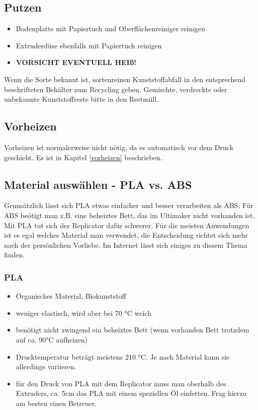 \documentclass{\basedir/fablab-document}
\begin{document}
\subsection{Putzen} \label{putzen}
\begin{itemize}
 \item Bodenplatte mit Papiertuch und Oberflächenreiniger reinigen
 \item Extruderdüse ebenfalls mit Papiertuch reinigen
 \item \textbf{VORSICHT EVENTUELL HEIß!}
\end{itemize}

Wenn die Sorte bekannt ist, sortenreinen Kunststoffabfall in den entsprechend beschrifteten Behälter zum Recycling geben. Gemischte, verdreckte oder unbekannte Kunststoffreste bitte in den Restmüll.

\subsection{Vorheizen}
Vorheizen ist normalerweise nicht nötig, da es automatisch vor dem Druck geschieht. Es ist in Kapitel \ref{vorheizen} beschrieben.

\subsection{Material auswählen - PLA vs. ABS}
Grunsätzlich lässt sich PLA etwas einfacher und besser verarbeiten als ABS. Für ABS beötigt man z.B. eine beheiztes
Bett, das im Ultimaker nicht vorhanden ist. Mit PLA tut sich der Replicator dafür schwerer. Für die meisten 
Anwendungen ist es egal welches Material man verwendet, die Entscheidung richtet sich mehr nach der persönlichen
Vorliebe. Im Internet lässt sich einiges zu diesem Thema finden.

\subsubsection{PLA}
\begin{itemize}
\item Organisches Material, Biokunststoff
\item weniger elastisch, wird aber bei 70 °C weich
\item benötigt nicht zwingend ein beheiztes Bett (wenn vorhanden Bett trotzdem auf ca. 90°C aufheizen)
\item Drucktemperatur beträgt meistens 210 °C. Je nach Material kann sie allerdings variieren.
\item für den Druck von PLA mit dem Replicator muss man oberhalb des Extruders, ca. 5cm das PLA mit einem speziellen
Öl einfetten. Frag hierzu am besten einen Betreuer.
\end{itemize}
\end{document}
